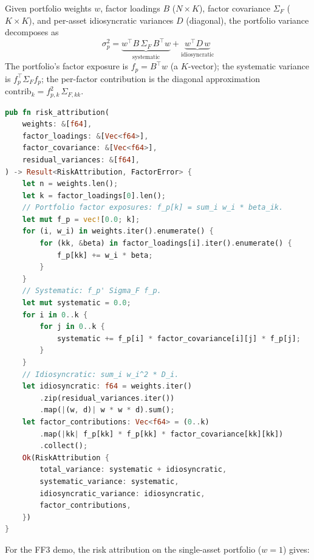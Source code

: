 
Given portfolio weights $w$, factor loadings $B$ ($N \times K$), factor
covariance $\Sigma_F$ ($K \times K$), and per-asset idiosyncratic
variances $D$ (diagonal), the portfolio variance decomposes as
\[
  \sigma_p^2 = \underbrace{w^\top B \, \Sigma_F \, B^\top w}_{\text{systematic}}
  + \underbrace{w^\top D \, w}_{\text{idiosyncratic}}
\]
The portfolio's factor exposure is $f_p = B^\top w$ (a $K$-vector);
the systematic variance is $f_p^\top \Sigma_F f_p$; the per-factor
contribution is the diagonal approximation
$\text{contrib}_k = f_{p,k}^2 \, \Sigma_{F,kk}$.

\begin{lstlisting}[language=Rust, caption={Risk attribution.}]
pub fn risk_attribution(
    weights: &[f64],
    factor_loadings: &[Vec<f64>],
    factor_covariance: &[Vec<f64>],
    residual_variances: &[f64],
) -> Result<RiskAttribution, FactorError> {
    let n = weights.len();
    let k = factor_loadings[0].len();
    // Portfolio factor exposures: f_p[k] = sum_i w_i * beta_ik.
    let mut f_p = vec![0.0; k];
    for (i, w_i) in weights.iter().enumerate() {
        for (kk, &beta) in factor_loadings[i].iter().enumerate() {
            f_p[kk] += w_i * beta;
        }
    }
    // Systematic: f_p' Sigma_F f_p.
    let mut systematic = 0.0;
    for i in 0..k {
        for j in 0..k {
            systematic += f_p[i] * factor_covariance[i][j] * f_p[j];
        }
    }
    // Idiosyncratic: sum_i w_i^2 * D_i.
    let idiosyncratic: f64 = weights.iter()
        .zip(residual_variances.iter())
        .map(|(w, d)| w * w * d).sum();
    let factor_contributions: Vec<f64> = (0..k)
        .map(|kk| f_p[kk] * f_p[kk] * factor_covariance[kk][kk])
        .collect();
    Ok(RiskAttribution {
        total_variance: systematic + idiosyncratic,
        systematic_variance: systematic,
        idiosyncratic_variance: idiosyncratic,
        factor_contributions,
    })
}
\end{lstlisting}

For the FF3 demo, the risk attribution on the single-asset portfolio
($w = 1$) gives:

